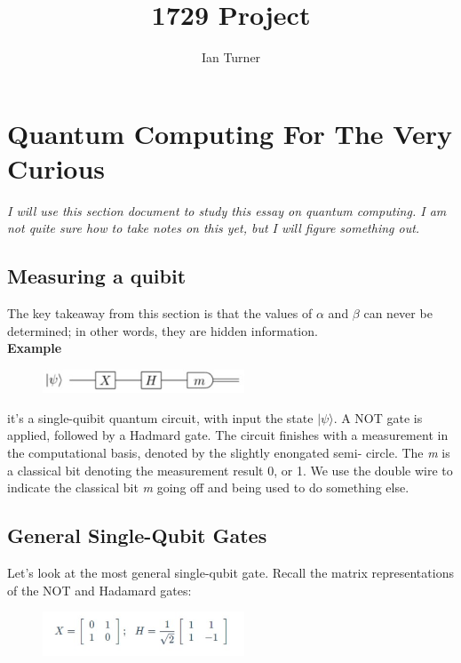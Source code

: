 \documentclass{article}
\title{1729 Project}
\author{Ian Turner}
\begin{document}
\maketitle
\section*{Quantum Computing For The Very Curious}
\textit{I will use this section document to study this essay on quantum
computing. I am not quite sure how to take notes on this yet, but I will
figure something out.}

\subsection*{Measuring a quibit}
The key takeaway from this section is that the values of $\alpha$ and $\beta$ can never
be determined; in other words, they are hidden information.\\
\textbf{Example}

\begin{figure}[h]
    \includegraphics[width=6cm]{1.jpg}
    \centering
\end{figure}

it's a single-quibit quantum circuit, with input the state $|$$\psi$$\rangle$.
A NOT gate is applied, followed by a Hadmard gate. The circuit finishes with a
measurement in the computational basis, denoted by the slightly enongated semi-
circle. The \textit{m} is a classical bit denoting the measurement result 0, or
1. We use the double wire to indicate the classical bit \textit{m} going off
and being used to do something else.

\subsection*{General Single-Qubit Gates}
Let's look at the most general single-qubit gate. Recall the matrix
representations of the NOT and Hadamard gates:

\begin{figure}[h]
    \includegraphics[width=6cm]{2.jpg}
    \centering
\end{figure}
\end{document}
